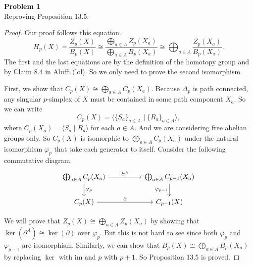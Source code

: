 \documentclass[12pt, a4paper]{article}
\theoremstyle{plain}
\def\phi{\varphi}
\newenvironment{problem}[2][Problem]
    { \begin{mdframed}[backgroundcolor=gray!20] \textbf{#1 #2} \\}
    {  \end{mdframed}}
\begin{document}
\begin{problem}{1}
    Reproving Proposition 13.5.
\end{problem}
    \begin{proof}
        Our proof follows this equation.
        \[
        H_p(X) = \frac{Z_p(X)}{B_p(X)} \cong \frac{\bigoplus_{a\in A}Z_p(X_a)}{\bigoplus_{a\in A}B_p(X_a)} \cong \bigoplus_{a\in A}\frac{Z_p(X_a)}{B_p(X_a)}.
        \]
        The first and the last equations are by the definition of the homotopy group and by Claim 8.4 in Aluffi (lol). So we only need to prove the second isomorphism.

        First, we show that $C_p(X)\cong\bigoplus_{a\in A}C_p(X_a)$. Because $\Delta_p$ is path connected, any singular $p$-simplex of $X$ must be contained in some path component $X_a$. So we can write 
        \[
        C_p(X) = \langle{\{S_a\}_{a\in A}\mid \{R_a\}_{a\in A}}\rangle,
        \]
        where $C_p(X_a) = \langle{S_a\mid R_a}\rangle$ for each $a\in A$. And we are considering free abelian groups only. So $C_p(X)$ is isomorphic to $\bigoplus_{a\in A}C_p(X_a)$ under the natural isomorphism $\phi_p$ that take each generator to itself. Consider the following commutative diagram.
\[\begin{tikzcd}
	{\bigoplus_{a\in A}C_p(X_a)} && {\bigoplus_{a\in A}C_{p-1}(X_a)} \\
	{C_p(X)} && {C_{p-1}(X)}
	\arrow["\partial", from=2-1, to=2-3]
	\arrow["\partial^A", from=1-1, to=1-3]
	\arrow["{\varphi_p}", from=1-1, to=2-1]
	\arrow["{\varphi_{p-1}}"', from=1-3, to=2-3]
\end{tikzcd}\]
        
        We will prove that $Z_p(X) \cong \bigoplus_{a\in A}Z_p(X_a)$ by showing that $\ker(\partial^A)\cong \ker(\partial)$ over $\phi_p$. But this is not hard to see since both $\varphi_p$ and $\varphi_{p-1}$ are isomorphism. Similarly, we can show that $B_p(X) \cong \bigoplus_{a\in A}B_p(X_a)$ by replacing $\ker$ with $\text{im}$ and $p$ with $p+1$. So Proposition 13.5 is proved.

        
    \end{proof}
\end{document}
